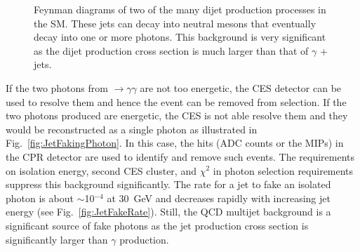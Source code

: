 \begin{figure}[h]
 \centering
{}
 \caption{Feynman diagrams of two of the many dijet production processes in the SM. These jets can decay into neutral mesons that eventually decay into one or more photons. This background is very significant as the dijet production cross section is much larger than that of $\gamma$ + jets.}
 \label{fig:DijetFeynmanDiags}
\end{figure}

If the two photons from \pizero$\to \gamma\gamma$ are not too energetic, the CES detector can be used to resolve them and hence the event can be removed from selection. If the two photons produced are energetic, the CES is not able resolve them and they would be reconstructed as a single photon as illustrated in Fig.~\ref{fig:JetFakingPhoton}. In this case, the hits (ADC counts or the MIPs) in the CPR detector are used to identify and remove such events. The requirements on isolation energy, second CES cluster, and $\chi^{2}$ in photon selection requirements suppress this background significantly. The rate for a jet to fake an isolated photon is about $\sim$10$^{-4}$ at 30~GeV and decreases rapidly with increasing jet energy (see Fig.~\ref{fig:JetFakeRate}). Still, the QCD multijet background is a significant source of fake photons as the jet production cross section is significantly larger than $\gamma$ production.

